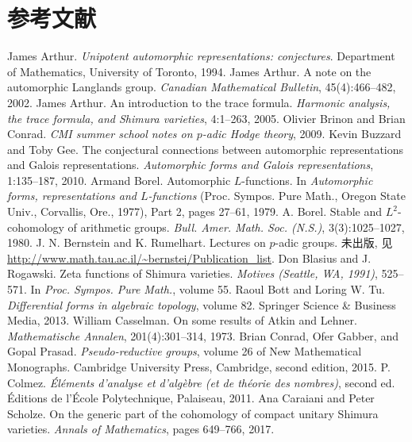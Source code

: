 \chapter{参考文献}

\begin{references}
 James Arthur. \emph{Unipotent automorphic representations: conjectures}. Department of Mathematics, University of Toronto, 1994.
 James Arthur. A note on the automorphic Langlands group. \emph{Canadian Mathematical Bulletin}, 45(4):466--482, 2002.
 James Arthur. An introduction to the trace formula. \emph{Harmonic analysis, the trace formula, and Shimura varieties}, 4:1--263, 2005.
 Olivier Brinon and Brian Conrad. \emph{CMI summer school notes on $p$-adic Hodge theory}, 2009.
 Kevin Buzzard and Toby Gee. The conjectural connections between automorphic representations and Galois representations. \emph{Automorphic forms and Galois representations}, 1:135--187, 2010.
 Armand Borel. Automorphic $L$-functions. In \emph{Automorphic forms, representations and $L$-functions} (Proc. Sympos. Pure Math., Oregon State Univ., Corvallis, Ore., 1977), Part 2, pages 27--61, 1979.
 A. Borel. Stable and $L^2$-cohomology of arithmetic groups. \emph{Bull. Amer. Math. Soc. (N.S.)}, 3(3):1025--1027, 1980.
 J. N. Bernstein and K. Rumelhart. Lectures on $p$-adic groups. 未出版, 见 \url{http://www.math.tau.ac.il/~bernstei/Publication_list}.
 Don Blasius and J. Rogawski. Zeta functions of Shimura varieties. \emph{Motives (Seattle, WA, 1991)}, 525--571. In \emph{Proc. Sympos. Pure Math.}, volume 55.
 Raoul Bott and Loring W. Tu. \emph{Differential forms in algebraic topology}, volume 82. Springer Science \& Business Media, 2013.
 William Casselman. On some results of Atkin and Lehner. \emph{Mathematische Annalen}, 201(4):301--314, 1973.
 Brian Conrad, Ofer Gabber, and Gopal Prasad. \emph{Pseudo-reductive groups}, volume 26 of New Mathematical Monographs. Cambridge University Press, Cambridge, second edition, 2015.
 P. Colmez. \emph{Éléments d'analyse et d'algèbre (et de théorie des nombres)}, second ed. Éditions de l'École Polytechnique, Palaiseau, 2011.
 Ana Caraiani and Peter Scholze. On the generic part of the cohomology of compact unitary Shimura varieties. \emph{Annals of Mathematics}, pages 649--766, 2017.

\end{references}
